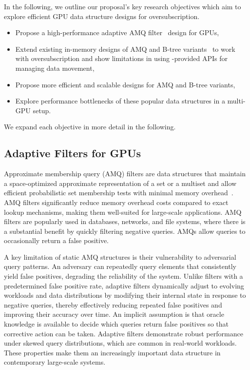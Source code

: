 \documentclass[12pt,a4paper]{article}
\begin{document}
In the following, we outline our proposal's key research objectives which aim
to explore efficient GPU data structure designs for oversubscription.

\begin{itemize}
    \item Propose a high-performance adaptive AMQ filter~\cite{aqf-sigmod} design for GPUs,
  \item Extend existing in-memory designs of AMQ and B-tree variants~\cite{gpu-btree,harmonia-gpu,multiversion-gpu-btree} to work with oversubscription and show limitations in using \nvidia-provided APIs for managing data movement,
    \item Propose more efficient and scalable designs for AMQ and B-tree variants,
    \item Explore performance bottlenecks of these popular data structures in a multi-GPU setup.
\end{itemize}

We expand each objective in more detail in the following.

\subsection*{Adaptive Filters for GPUs}

Approximate membership query (AMQ) filters are data structures that maintain a
space-optimized approximate representation of a set or a multiset and allow
efficient probabilistic set membership tests with minimal memory
overhead~\cite{gpu-filters-ppopp23,aqf-sigmod}. AMQ filters significantly reduce
memory overhead costs compared to exact lookup mechanisms, making them
well-suited for large-scale applications. AMQ filters are popularly used in
databases, networks, and file systems, where there is a substantial benefit by
quickly filtering negative queries. AMQs allow queries to occasionally
return a false positive.

A key limitation of static AMQ structures is their vulnerability to adversarial query patterns. An adversary can repeatedly query elements that consistently yield false positives, degrading the reliability of the system. Unlike filters with a predetermined false positive rate, adaptive filters dynamically adjust to evolving workloads and data distributions by modifying their internal state in response to negative queries, thereby effectively reducing repeated false positives and improving their accuracy over time.
An implicit assumption is that oracle knowledge is available to decide which queries return false positives so that corrective action can be taken.
Adaptive filters demonstrate robust performance under skewed query distributions, which are common in real-world workloads. These properties make them an increasingly important data structure in contemporary large-scale systems.
\end{document}
